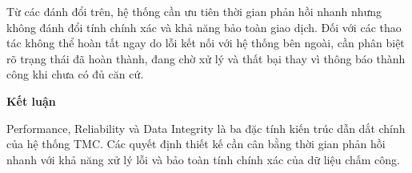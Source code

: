 Từ các đánh đổi trên, hệ thống cần ưu tiên thời gian phản hồi nhanh nhưng không đánh đổi tính chính xác và khả năng bảo toàn giao dịch. Đối với các thao tác không thể hoàn tất ngay do lỗi kết nối với hệ thống bên ngoài, cần phân biệt rõ trạng thái đã hoàn thành, đang chờ xử lý và thất bại thay vì thông báo thành công khi chưa có đủ căn cứ.

\noindent\textbf{Kết luận}

Performance, Reliability và Data Integrity là ba đặc tính kiến trúc dẫn dắt chính của hệ thống TMC. Các quyết định thiết kế cần cân bằng thời gian phản hồi nhanh với khả năng xử lý lỗi và bảo toàn tính chính xác của dữ liệu chấm công.